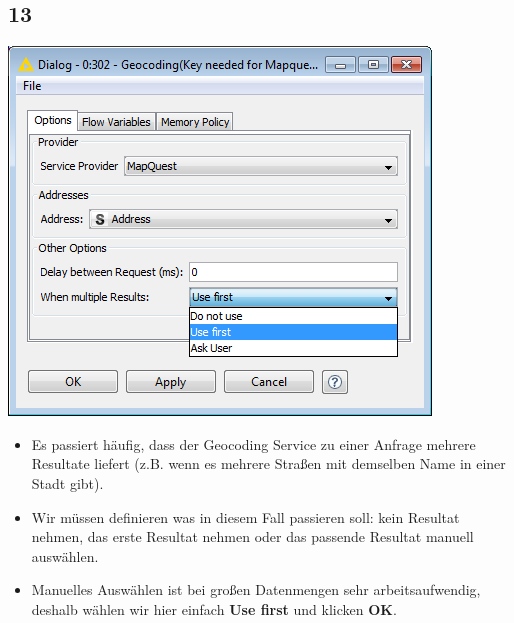 \documentclass{beamer}
\begin{document}
\subsection{13}
\begin{frame}
	\begin{center}
  		\includegraphics[height=0.4\textheight]{13.png}
	\end{center}
	\begin{itemize}
		\item Es passiert häufig, dass der Geocoding Service zu einer Anfrage mehrere Resultate liefert (z.B. wenn es mehrere Straßen mit demselben Name in einer Stadt gibt).
		\item Wir müssen definieren was in diesem Fall passieren soll: kein Resultat nehmen, das erste Resultat nehmen oder das passende Resultat manuell auswählen.
		\item Manuelles Auswählen ist bei großen Datenmengen sehr arbeitsaufwendig, deshalb wählen wir hier einfach \textbf{Use first} und klicken \textbf{OK}.
	\end{itemize}
\end{frame}
\end{document}
